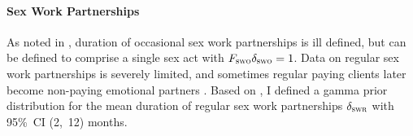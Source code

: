\paragraph{Sex Work Partnerships}
As noted in , duration of occasional sex work partnerships
is ill defined, but can be defined to comprise a single sex act with
$F_{\textsc{swo}}\delta_{\textsc{swo}} = 1$.
Data on regular sex work partnerships is severely limited, and
sometimes regular paying clients later become
non-paying emotional partners \cite{Voeten2007,Mbonye2022}.
Based on \cite{Voeten2002}, I defined a gamma prior distribution for
the mean duration of regular sex work partnerships $\delta_{\textsc{swr}}$
with 95\%~CI (2,~12) months.
